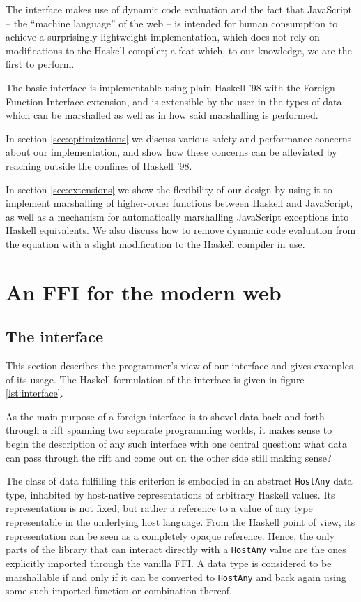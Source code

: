 \documentclass{sigplanconf}
\begin{document}
The interface makes use of dynamic code evaluation and the fact that
JavaScript -- the ``machine language'' of the web -- is intended for human
consumption to achieve a surprisingly lightweight implementation, which
does not rely on modifications to the Haskell compiler; a feat which,
to our knowledge, we are the first to perform.

The basic interface is implementable using plain Haskell '98 with the
Foreign Function Interface extension, and is extensible by the user in the
types of data which can be marshalled as well as in how said marshalling is
performed.

In section \ref{sec:optimizations} we discuss various safety and performance
concerns about our implementation, and show how these concerns can be
alleviated by reaching outside the confines of Haskell '98.

In section \ref{sec:extensions} we show the flexibility of our design by using
it to implement marshalling of higher-order functions between Haskell and
JavaScript, as well as a mechanism for automatically marshalling JavaScript
exceptions into Haskell equivalents.
We also discuss how to remove dynamic code evaluation from the equation
with a slight modification to the Haskell compiler in use.

\section{An FFI for the modern web}\label{sec:interface}
\subsection{The interface}
This section describes the programmer's view of our interface and gives
examples of its usage.
The Haskell formulation of the interface is given in figure \ref{lst:interface}.

As the main purpose of a foreign interface is to shovel data back and
forth through a rift spanning two separate programming worlds, it makes sense
to begin the description of any such interface with one central question:
what data can pass through the rift and come out on the other side still making
sense?

The class of data fulfilling this criterion is embodied in an
abstract \lstinline!HostAny! data type, inhabited by host-native
representations of arbitrary Haskell values. Its representation is not fixed,
but rather a reference to a value of any type representable in the underlying
host language. From the Haskell point of view, its representation can be seen
as a completely opaque reference.
Hence, the only parts of the library that can interact directly
with a \lstinline!HostAny! value are the ones explicitly imported through the
vanilla FFI.
A data type is considered to be marshallable if and only if it can be
converted to \lstinline!HostAny! and back again using some such imported
function or combination thereof.
\end{document}
